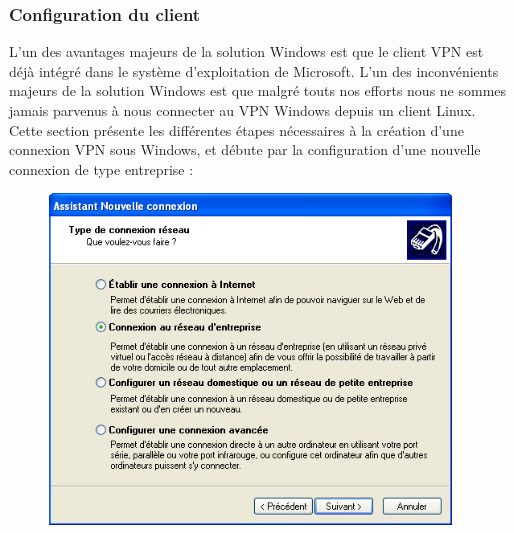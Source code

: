 \subsubsection{Configuration du client}
\label{label_client_windows}

L'un des avantages majeurs de la solution Windows est que le client VPN est déjà intégré dans le système d'exploitation de Microsoft. L'un des inconvénients majeurs de la solution Windows est que malgré touts nos efforts nous ne sommes jamais parvenus à nous connecter au VPN Windows depuis un client Linux. Cette section présente les différentes étapes nécessaires à la création d'une connexion VPN sous Windows, et débute par la configuration d'une nouvelle connexion de type entreprise :

\begin{figure}[H]
	\begin{minipage}{0.5\textwidth}
		\begin{flushleft} \large
			\includegraphics[width=0.95\textwidth]{partie_2/screen_windows/etape1.PNG}\\
		\end{flushleft}
	\end{minipage}
	\begin{minipage}{0.49\textwidth}
		\begin{flushright} \large

\end{flushright}
\end{minipage}
\end{figure}
